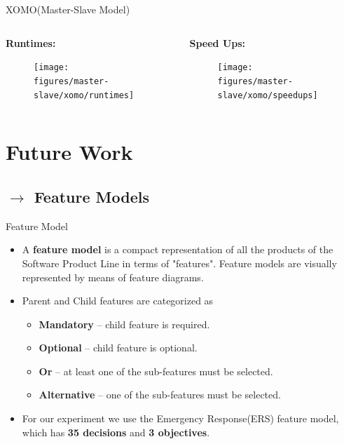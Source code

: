 \documentclass[10pt]{beamer}
\begin{document}
\begin{frame}{XOMO(Master-Slave Model)}
    \begin{columns}[t]
        \begin{column}{0.5\linewidth}
        \textbf{Runtimes:}
        \begin{figure}
            \centering
            \texttt{[image: figures/master-slave/xomo/runtimes]}
            \label{fig:XOMO_MS_DE_runtimes}
        \end{figure}
        \end{column}
        \begin{column}{0.5\linewidth}
        \textbf{Speed Ups:}
        \begin{figure}
            \centering
            \texttt{[image: figures/master-slave/xomo/speedups]}
            \label{fig:XOMO_MS_speedups}
        \end{figure}
        \end{column}
    \end{columns}
\end{frame}

\section{Future Work}
\subsection{$\rightarrow$ Feature Models}
\begin{frame}{Feature Model}
\begin{itemize}
\item<1-> A \textbf{feature model} is a compact representation of all the products of the Software Product Line in terms of "features". Feature models are visually represented by means of feature diagrams.
\item<2-> Parent and Child features are categorized as
    \begin{itemize}
        \item<2-> \textbf{Mandatory} – child feature is required.
        \item<2-> \textbf{Optional} – child feature is optional.
        \item<2-> \textbf{Or} – at least one of the sub-features must be selected.
        \item<2-> \textbf{Alternative} – one of the sub-features must be selected.
    \end{itemize}
\item<3-> For our experiment we use the Emergency Response(ERS) feature model, which has \textbf{35 decisions} and \textbf{3 objectives}. 
\end{itemize}

\end{frame}
\end{document}
